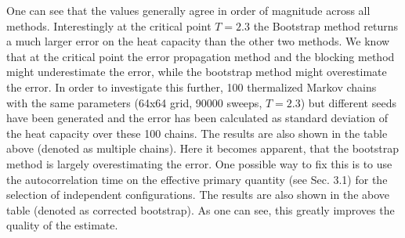 \documentclass[11pt, a4paper]{scrartcl}
\begin{document}
    One can see that the values generally agree in order of magnitude across all methods. Interestingly at the critical point $T = 2.3$ the Bootstrap method returns a much larger error on the heat capacity than the other two methods. We know that at the critical point the error propagation method and the blocking method might underestimate the error, while the bootstrap method might overestimate the error. In order to investigate this further, 100 thermalized Markov chains with the same parameters (64x64 grid, 90000 sweeps, $T = 2.3$) but different seeds have been generated and the error has been calculated as standard deviation of the heat capacity over these 100 chains. The results are also shown in the table above (denoted as multiple chains). Here it becomes apparent, that the bootstrap method is largely overestimating the error. One possible way to fix this is to use the autocorrelation time on the effective primary quantity (see Sec. 3.1) for the selection of independent configurations. The results are also shown in the above table (denoted as corrected bootstrap). As one can see, this greatly improves the quality of the estimate.
\end{document}
